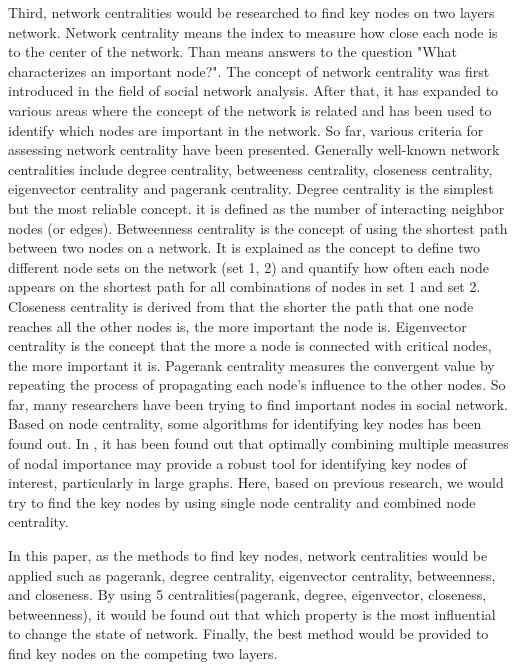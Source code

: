 Third, network centralities would be researched to find key nodes on two layers network. Network centrality means the index to measure how close each node is to the center of the network. Than means answers to the question "What characterizes an important node?". The concept of network centrality was first introduced in the field of social network analysis.\parencite{freeman1979} After that, it has expanded to various areas where the concept of the network is related and has been used to identify which nodes are important in the network. So far, various criteria for assessing network centrality have been presented. Generally well-known network centralities include degree centrality, betweeness centrality, closeness centrality, eigenvector centrality and pagerank centrality.\parencite{koschutzki2008}
Degree centrality is the simplest but the most reliable concept. it is defined as the number of interacting neighbor nodes (or edges). Betweenness centrality is the concept of using the shortest path between two nodes on a network. It is explained as the concept to  define two different node sets on the network (set 1, 2) and quantify how often each node appears on the shortest path for all combinations of nodes in set 1 and set 2. Closeness centrality is derived from that the shorter the path that one node reaches all the other nodes is, the more important the node is. Eigenvector centrality is the concept that the more a node is connected with critical nodes, the more important it is. Pagerank centrality measures the convergent value by repeating the process of propagating each node's influence to the other nodes. 
So far, many researchers have been trying to find important nodes in social network.\parencite{eom2015, white2003, mesgari2015, hwang1981, huang2014} Based on node centrality, some algorithms for identifying key nodes has been found out. In \parencite{mesgari2015, huang2014}, it has been found out that optimally combining multiple measures of nodal importance may provide a robust tool for identifying key nodes of interest, particularly in large graphs. Here, based on previous research, we would try to find the key nodes by using single node centrality and combined node centrality. 

In this paper, as the methods to find key nodes, network centralities would be applied such as pagerank, degree centrality, eigenvector centrality, betweenness, and closeness.\parencite{francisco2019, bianconi2018} By using 5 centralities(pagerank, degree, eigenvector, closeness, betweenness), it would be found out that which property is the most influential to change the state of network. Finally, the best method would be provided to find key nodes on the competing two layers. 


